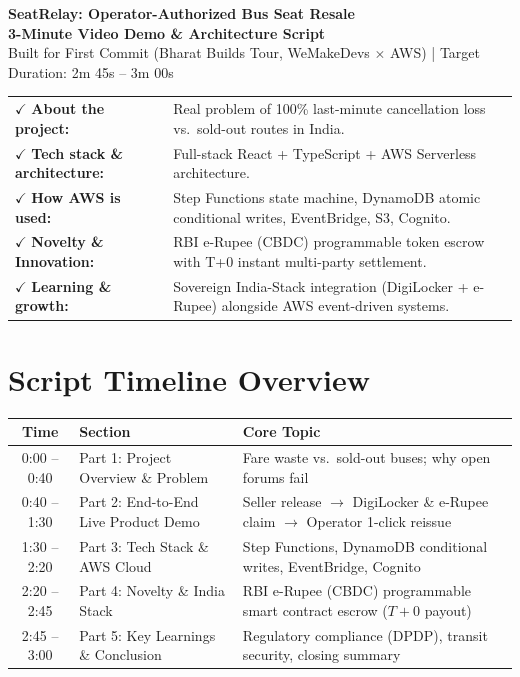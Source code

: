 \documentclass[11pt,a4paper]{article}
\begin{document}
\begin{center}
    {\LARGE \textbf{\textcolor{primary}{SeatRelay: Operator-Authorized Bus Seat Resale}}}\\[0.3em]
    {\large \textbf{\textcolor{accent}{3-Minute Video Demo \& Architecture Script}}}\\[0.4em]
    \textcolor{cuecolor}{\small Built for First Commit (Bharat Builds Tour, WeMakeDevs $\times$ AWS) | Target Duration: 2m 45s -- 3m 00s}
\end{center}

\vspace{0.3em}

\begin{tcolorbox}[colback=primary!5,colframe=primary,title=\textbf{Submission Requirements Checklist Met},fonttitle=\small\bfseries,boxrule=1pt,arc=2mm]
\small
\begin{tabularx}{\textwidth}{l X}
$\checkmark$ \textbf{About the project:} & Real problem of 100\% last-minute cancellation loss vs.\ sold-out routes in India.\\
$\checkmark$ \textbf{Tech stack \& architecture:} & Full-stack React + TypeScript + AWS Serverless architecture.\\
$\checkmark$ \textbf{How AWS is used:} & Step Functions state machine, DynamoDB atomic conditional writes, EventBridge, S3, Cognito.\\
$\checkmark$ \textbf{Novelty \& Innovation:} & RBI e-Rupee (CBDC) programmable token escrow with T+0 instant multi-party settlement.\\
$\checkmark$ \textbf{Learning \& growth:} & Sovereign India-Stack integration (DigiLocker + e-Rupee) alongside AWS event-driven systems.\\
\end{tabularx}
\end{tcolorbox}

\vspace{0.3em}

\section*{Script Timeline Overview}

\noindent
\begin{tabularx}{\textwidth}{|c|l|X|}
\hline
\textbf{Time} & \textbf{Section} & \textbf{Core Topic} \\
\hline
0:00 -- 0:40 & Part 1: Project Overview \& Problem & Fare waste vs.\ sold-out buses; why open forums fail \\
0:40 -- 1:30 & Part 2: End-to-End Live Product Demo & Seller release $\rightarrow$ DigiLocker \& e-Rupee claim $\rightarrow$ Operator 1-click reissue \\
1:30 -- 2:20 & Part 3: Tech Stack \& AWS Cloud & Step Functions, DynamoDB conditional writes, EventBridge, Cognito \\
2:20 -- 2:45 & Part 4: Novelty \& India Stack & RBI e-Rupee (CBDC) programmable smart contract escrow ($T+0$ payout) \\
2:45 -- 3:00 & Part 5: Key Learnings \& Conclusion & Regulatory compliance (DPDP), transit security, closing summary \\
\hline
\end{tabularx}
\end{document}

